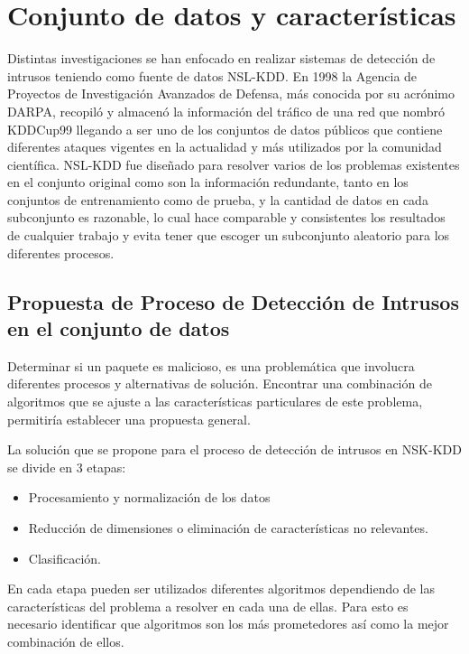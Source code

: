 


\section{Conjunto de datos y características}
Distintas investigaciones se han enfocado en realizar sistemas de detección de intrusos teniendo como fuente de datos NSL-KDD. En 1998 la Agencia de Proyectos de Investigación Avanzados de Defensa, más conocida por su acrónimo DARPA, recopiló y almacenó la información del tráfico de una red que nombró KDDCup99 llegando a ser uno de los conjuntos de datos públicos que contiene diferentes ataques vigentes en la actualidad y más utilizados por la comunidad científica. NSL-KDD fue diseñado para resolver varios de los problemas existentes en el conjunto original como son la información redundante, tanto en los conjuntos de entrenamiento como de prueba, y la cantidad de datos en cada subconjunto es razonable, lo cual hace comparable y consistentes los resultados de cualquier trabajo y evita tener que escoger un subconjunto aleatorio para los diferentes procesos.

\subsection{Propuesta de Proceso de Detección de Intrusos en el conjunto de datos}
Determinar si un paquete es malicioso, es una problemática que involucra diferentes procesos y alternativas de solución. Encontrar una combinación de algoritmos que se ajuste a las características particulares de este problema, permitiría establecer una propuesta general.

La solución que se propone para el proceso de detección de intrusos en NSK-KDD se divide en 3 etapas:

\begin{itemize}
    \item Procesamiento y normalización de los datos
    \item Reducción de dimensiones o eliminación de características no relevantes.
    \item Clasificación.
\end{itemize}

En cada etapa pueden ser utilizados diferentes algoritmos dependiendo de las características del problema a resolver en cada una de ellas. Para esto es necesario identificar que algoritmos son los más prometedores así como la mejor combinación de ellos.

